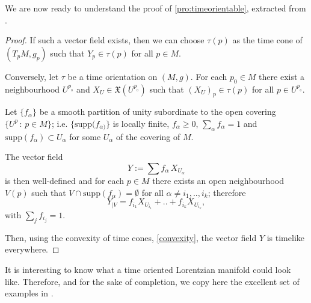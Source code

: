 We are now ready to understand the proof of \autoref{pro:timeorientable}, extracted from \cite[p. 201]{romero10}.

\begin{proof}
	If such a vector field exists, then we can choose $\tau(p)$ as the time cone of $(T_pM,g_p)$ such that $Y_p\in \tau(p)$ for all $p\in M$.
	
	Conversely, let $\tau$ be a time orientation on $(M,g)$. For each $p_0 \in M$ there exist a neighbourhood $U^{p_{_0}}$ and $X_U\in \mathfrak{X}(U^{p_{_0}})$ such that $(X_U)_p \in \tau(p)$ for all $p\in U^{p_{_0}}$.
	
	Let $\{f_{\alpha}\}$ be a smooth partition of unity subordinate to the open covering $\{U^p\, : \, p\in M\}$; i.e. $\{\mathrm{supp}(f_{\alpha)}\}$ is locally finite, $f_{\alpha}\geq 0$, $\sum_{\alpha} f_{\alpha}=1$ and $\mathrm{supp}(f_{\alpha}) \subset U_{\alpha}$ for some $U_{\alpha}$ of the covering of $M$.
	
	The vector field 
	\[
	Y:=\sum f_{\alpha}\, X_{U_{\alpha}}
	\] 
	is then well-defined and for each $p\in M$ there exists an open neighbourhood $V(p)$ such that $V \cap \mathrm{supp}(f_{\alpha}) = \emptyset$ for all $\alpha \neq i_1,..,i_k$; therefore
	\[
	Y_{\mid V}=f_{i_1}X_{U_{i_1}}+..+f_{i_k}X_{U_{i_k}},
	\]
	with $\sum_j f_{i_j}=1$.
	
	Then, using the convexity of time cones, \autoref{convexity}, the vector field $Y$ is timelike everywhere.
\end{proof}

It is interesting to know what a time oriented Lorentzian manifold could look like. Therefore, and for the sake of completion, we copy here the excellent set of examples in \cite[Example 3.2]{romero10}.

